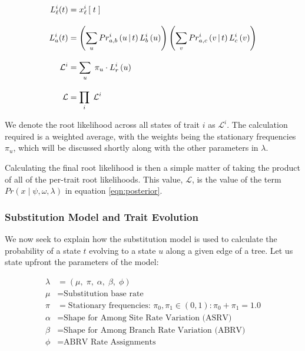\documentclass[10pt,journal,compsoc]{IEEEtran}
\begin{document}
\begin{equation}\label{eqn:felsenstein}
    \setlength{\jot}{12px}
    \begin{split}
        L_\ell^{i}(t) &= x_\ell^{i}\left[\;t\;\right] \\
        L_a^{i}(t) &= \left(\sum_uPr^i_{a,b}\left(u\,\vert\,t\right)L_b^{i}\left(u\right)\right)\left(\sum_vPr^i_{a,c}\left(v\,\vert\,t\right)L_c^{i}\left(v\right)\right) \\
        \mathcal{L}^{i} &= \sum_u \;\pi_u \cdot L_r^{i}\left(u\right) \\
        \mathcal{L} &= \prod_i \;\mathcal{L}^i
    \end{split}
\end{equation}

We denote the root likelihood across all states of trait $i$ as $\mathcal{L}^{i}$. The calculation required is a weighted average, with the weights being the stationary frequencies $\pi_u$, which will be discussed shortly along with the other parameters in $\lambda$.

Calculating the final root likelihood is then a simple matter of taking the product of all of the per-trait root likelihoods. This value, $\mathcal{L}$, is the value of the term $Pr(x\;|\;\psi, \omega, \lambda)$ in equation \eqref{eqn:posterior}.

\subsubsection{Substitution Model and Trait Evolution}

We now seek to explain how the substitution model is used to calculate the probability of a state $t$ evolving to a state $u$ along a given edge of a tree. Let us state upfront the parameters of the model:

\begin{align*}
    \lambda &= (\mu,\;\pi,\;\alpha,\;\beta,\;\phi)\\
    \mu &= \text{Substitution base rate}\\
    \pi &= \text{Stationary frequencies: } \pi_0, \pi_1 \in \left(0, 1\right) : \pi_0 + \pi_1 = 1.0\\
    \alpha &= \text{Shape for Among Site Rate Variation (ASRV)}\\
    \beta &= \text{Shape for Among Branch Rate Variation (ABRV)}\\
    \phi &= \text{ABRV Rate Assignments}
\end{align*}
\end{document}
